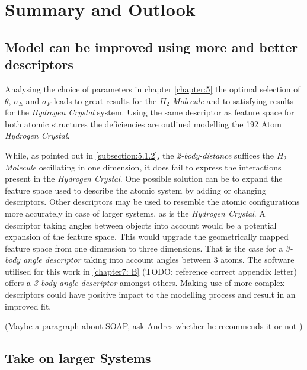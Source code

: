 \chapter{Summary and Outlook}
\label{chapter:6}

\section{Model can be improved using more and better descriptors}
\label{section:6.1}
Analysing the choice of parameters in chapter \ref{chapter:5} the optimal selection of $\theta$, $\sigma_E$ and $\sigma_F$ leads to great results for the $H_2$ \textit{Molecule} and to satisfying results for the \textit{Hydrogen Crystal} system. Using the same descriptor as feature space for both atomic structures the deficiencies are outlined modelling the 192 Atom \textit{Hydrogen Crystal}. 

While, as pointed out in \ref{subsection:5.1.2}, the \textit{2-body-distance} suffices the $H_2$ \textit{Molecule} oscillating in one dimension, it does fail to express the interactions present in the \textit{Hydrogen Crystal}. 
One possible solution can be to expand the feature space used to describe the atomic system by adding or changing descriptors. Other descriptors may be used to resemble the atomic configurations more accurately in case of larger systems, as is the \textit{Hydrogen Crystal}. A descriptor taking angles between objects into account would be a potential expansion of the feature space. This would upgrade the geometrically mapped feature space from one dimension to three dimensions. That is the case for a \textit{3-body angle descriptor} taking into account angles between 3 atoms. The software utilised for this work in \ref{chapter7: B} (TODO: reference correct appendix letter) offers a \textit{3-body angle descriptor} amongst others. Making use of more complex descriptors could have positive impact to the modelling process and result in an improved fit. 

(Maybe a paragraph about SOAP, ask Andres whether he recommends it or not )
 



\section{Take on larger Systems}
\label{section:6.2}

